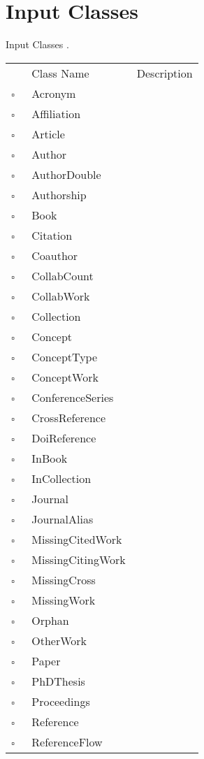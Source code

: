 \chapter{Input Classes}
Input Classes     .
\begin{longtable}{llp{8cm}}
& Class Name & Description \\
$\square$\ & Acronym &  \\
$\square$\ & Affiliation &  \\
$\square$\ & Article &  \\
$\square$\ & Author &  \\
$\square$\ & AuthorDouble &  \\
$\square$\ & Authorship &  \\
$\square$\ & Book &  \\
$\square$\ & Citation &  \\
$\square$\ & Coauthor &  \\
$\square$\ & CollabCount &  \\
$\square$\ & CollabWork &  \\
$\square$\ & Collection &  \\
$\square$\ & Concept &  \\
$\square$\ & ConceptType &  \\
$\square$\ & ConceptWork &  \\
$\square$\ & ConferenceSeries &  \\
$\square$\ & CrossReference &  \\
$\square$\ & DoiReference &  \\
$\square$\ & InBook &  \\
$\square$\ & InCollection &  \\
$\square$\ & Journal &  \\
$\square$\ & JournalAlias &  \\
$\square$\ & MissingCitedWork &  \\
$\square$\ & MissingCitingWork &  \\
$\square$\ & MissingCross &  \\
$\square$\ & MissingWork &  \\
$\square$\ & Orphan &  \\
$\square$\ & OtherWork &  \\
$\square$\ & Paper &  \\
$\square$\ & PhDThesis &  \\
$\square$\ & Proceedings &  \\
$\square$\ & Reference &  \\
$\square$\ & ReferenceFlow &  \\

\end{longtable}
